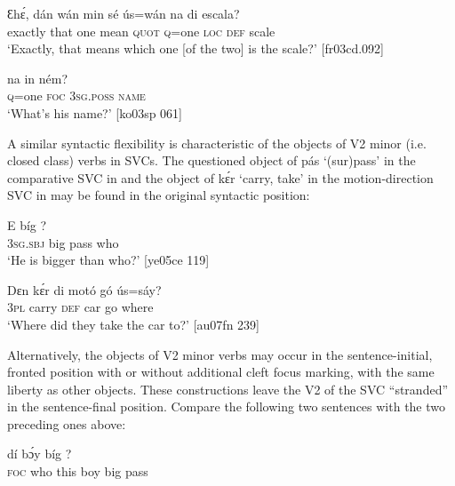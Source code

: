 \ea%
    \label{ex:key:604}
    \gll Ɛhɛ́,    dán  wán  min    sé    ús=wán  na  di  escala?\\
exactly  that  one  mean  \textsc{quot}    \textsc{q}=one  \textsc{loc}  \textsc{def}  scale\\

\glt ‘Exactly, that means which one [of the two] is the scale?’ [fr03cd.092]
\z


\ea%
    \label{ex:key:605}
    \gll {}  na  in    ném?\\
\textsc{q}=one  \textsc{foc}  \textsc{3sg.poss}  \textsc{name}\\

\glt ‘What’s his name?’ [ko03sp 061]
\z

A similar syntactic flexibility is characteristic of the objects of V2 minor (i.e. closed class) verbs in SVCs. The questioned object of pás ‘(sur)pass’ in the comparative SVC{\fff} in  and the object of kɛ́r ‘carry, take’ in the motion-direction SVC in  may be found in the original syntactic position:


\ea%
    \label{ex:key:606}
    \gll E    bíg      ?\\
\textsc{3sg.sbj}  big  pass    who\\

\glt ‘He is bigger than who?’ [ye05ce 119]
\z


\ea%
    \label{ex:key:607}
    \gll Dɛn  kɛ́r    di  motó  gó  ús=sáy?\\
\textsc{3pl}  carry  \textsc{def}  car    go  where\\

\glt ‘Where did they take the car to?’ [au07fn 239]
\z

Alternatively, the objects of V2 minor verbs may occur in the sentence-initial, fronted position with or without additional cleft focus marking, with the same liberty as other objects. These constructions leave the V2 of the SVC “stranded” in the sentence-final position. Compare the following two sentences with the two preceding ones above: 


\ea%
    \label{ex:key:608}
    \gll {}    dí  bɔ́y  bíg  ?\\
\textsc{foc}  who    this  boy  big  pass\\

